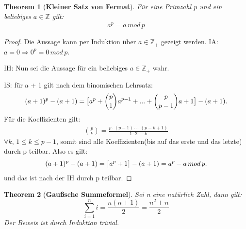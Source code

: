 \documentclass[12pt,oneside]{article}
\newtheorem{theorem}{Theorem}[section]
\theoremstyle{remark}
\theoremstyle{definition}
\begin{document}
\smallskip

\begin{theorem}[\textbf{Kleiner Satz von Fermat}]\label{Th_2}
Für eine Primzahl $p$ und ein beliebiges $a \in \mathbb{Z}$ gilt:
\begin{align*}
    a^p = a \, mod \, p
\end{align*}
\end{theorem}

\begin{proof}
Die Aussage kann per Induktion über $a \in \mathbb{Z}_{+}$ gezeigt werden.\newline\newline
IA: $a = 0  \Rightarrow 0^p = 0 \, mod \, p$.\newline\newline

IH: Nun sei die Aussage für ein beliebiges $a \in \mathbb{Z}_{+}$ wahr.\newline\newline

IS: für a + 1 gilt nach dem binomischen Lehrsatz:
\begin{align*}
    (a + 1)^p - (a + 1) = \big{[}a^p + {p \choose 1}a^{p - 1} + ... +{p \choose p - 1} a + 1\big{]} - (a + 1).
\end{align*}
Für die Koeffizienten gilt: 
\begin{align*}
    {p \choose k} = \frac{p \cdot (p - 1) \cdot \cdot \cdot (p - k + 1)}{1 \cdot 2 \cdot \cdot \cdot k}
\end{align*}
$\forall k, \,  1 \leq k \leq p - 1$, somit sind alle Koeffizienten(bis auf das erste und das letzte) durch p teilbar.\newline\newline
Also es gilt:
\begin{align*}
(a + 1)^p - (a + 1) = \big{[} a^p + 1 \big{]} - (a + 1) = a^p - a \, mod \, p.
\end{align*}
und das ist nach der IH durch p teilbar.\newline  
\end{proof}

\smallskip

\begin{theorem}[\textbf{Gaußsche Summeformel}]\label{gauss}
Sei n eine natürlich Zahl, dann gilt:
\begin{equation}
    \sum_{i = 1}^{n} i = \frac{n (n + 1)}{2} = \frac{n^2 + n}{2} 
\end{equation}
Der Beweis ist durch Induktion trivial.\newline\newline 
\end{theorem}
\end{document}
